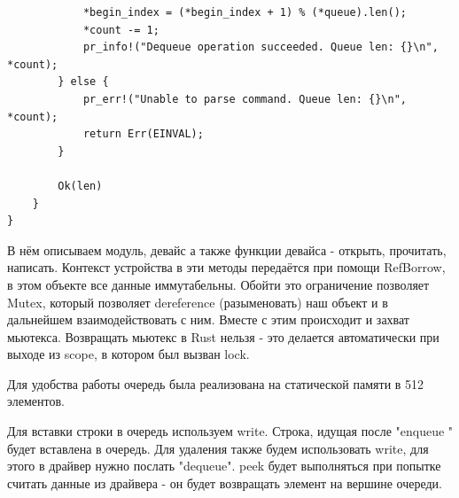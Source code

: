 \documentclass[a4paper,14pt]{extarticle}
\begin{document}
\begin{verbatim}
            *begin_index = (*begin_index + 1) % (*queue).len();
            *count -= 1;
            pr_info!("Dequeue operation succeeded. Queue len: {}\n", *count);
        } else {
            pr_err!("Unable to parse command. Queue len: {}\n", *count);
            return Err(EINVAL);
        }
        
        Ok(len)
    }
}
\end{verbatim}

В нём описываем модуль, девайс а также функции девайса - открыть, прочитать, написать.
Контекст устройства в эти методы передаётся при помощи RefBorrow, в этом объекте
все данные иммутабельны. Обойти это ограничение позволяет Mutex, который позволяет
dereference (разыменовать) наш объект и в дальнейшем взаимодействовать с ним.
Вместе с этим происходит и захват мьютекса. Возвращать мьютекс в Rust нельзя - 
это делается автоматически при выходе из scope, в котором был вызван lock. 

Для удобства работы очередь была реализована на статической памяти в 512 элементов.

Для вставки строки в очередь используем write. Строка, идущая после "enqueue " будет
вставлена в очередь. Для удаления также будем использовать write, для этого в драйвер
нужно послать "dequeue". peek будет выполняться при попытке считать данные из драйвера - 
он будет возвращать элемент на вершине очереди.
\end{document}
